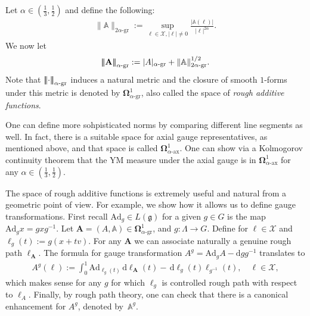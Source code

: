 \documentclass[12pt]{article}
\numberwithin{equation}{section}
\theoremstyle{definition}
\theoremstyle{remark}
\newcommand{\Ad}{\mathrm{Ad}}
\newcommand{\dif}{\,\mathrm{d}}
\newcommand{\diff}{\mathrm{d}}
\newcommand{\1}{\mathbf 1}
\newcommand{\<}{\langle}
\renewcommand{\>}{\rangle}
\newcommand{\ax}{\text{-}\mathrm{ax}}
\newcommand{\gr}{\text{-}\mathrm{gr}}
\newcommand{\green}[1]{\textcolor{darkgreen}{#1}}
\newcommand{\bfA}{\mathbf A}
\newcommand{\bA}{\mathbb A}
\newcommand{\bfOmega}{\boldsymbol{\Omega}}
\newcommand{\cX}{\mathcal X}
\newcommand{\fg}{\mathfrak g}
\newcommand{\vertiii}[1]{{\left\vert\kern-0.4ex\left\vert\kern-0.4ex\left\vert #1 
    \right\vert\kern-0.4ex\right\vert\kern-0.4ex\right\vert}}
\newcommand{\triple}[1]{\vertiii{#1}}
\begin{document}
%
Let $\alpha\in (\frac 13,\frac 12)$ and define the following:
\begin{align}
\|\bA\|_{2\alpha\gr}:=\sup_{\ell\in\cX,|\ell|\neq 0}\frac{|\bA(\ell)|}{|\ell|^{2\alpha}}. 
\end{align}
We now let 	\begin{align}\triple{\bfA}_{\alpha\gr}:=|A|_{\alpha\gr}+\|\bA\|_{2\alpha\gr}^{1/2}.\end{align} 
    Note that $\triple{\cdot}_{\alpha\gr}$ induces a natural metric and the closure of smooth $1$-forms under this metric is denoted by $\bfOmega^1_{\alpha\gr}$, also called the space of \emph{rough additive functions}.   

One can define more sohpisticated norms 
 by comparing different line segments as well. In fact, there is a suitable space for axial gauge representatives, as mentioned above, and that space is called $\bfOmega_{\alpha\ax}^1$. One can show via a Kolmogorov continuity theorem that the YM measure under the axial gauge is in  $\bfOmega_{\alpha\ax}^1$ for any $\alpha\in (\frac 1 3,\frac 1 2)$. 



The space of rough additive functions is extremely useful and natural from a geometric point of view. For example, we show how it allows us to define gauge transformations. First recall  $\Ad_g\in L(\fg)$ for a given $g\in G$ is the map $\Ad_gx=gxg^{-1}$.
Let $\bfA=(A,\bA)\in \bfOmega^1_{\alpha\gr}$, and $g:\Lambda\to G$. Define for $\ell\in\cX$ and $\ell_g(t):=g(x+tv)$. For any $\bfA$ we can associate naturally a genuine rough path $\ell_\bfA$.   The formula for gauge transformation $A^g=\Ad_g A-\diff gg^{-1}$ translates to  \begin{align}\label{e:gauge_trafo_connection:2}
		A^g(\ell):=\int^1_0 \Ad_{\ell_g(t)}\dif\ell_{\bfA}(t)-\dif\ell_g(t)\ell_{g^{-1}}(t), \quad \ell \in \cX,
	\end{align}
    which makes sense for any $g$ for which $\ell_g$ is controlled rough path with respect to $\ell_A$. Finally, by rough path theory, one can check that there is a canonical enhancement for $A^g$, denoted by~$\bA^g$. 
\end{document}
